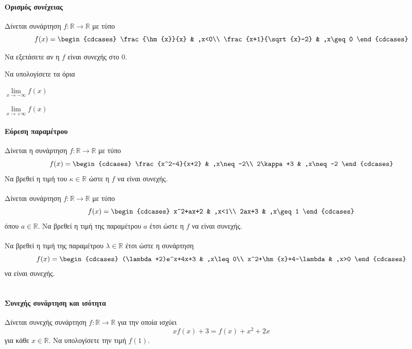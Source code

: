 \documentclass[11pt,a4paper,modern]{FFExercises}
\begin{document}
\paragraph{Ορισμός συνέχειας}
\askhsh Δίνεται συνάρτηση $f:\mathbb{R}\to\mathbb{R}$ με τύπο
\[ f(x)=\begin{cdcases}
\frac{\hm{x}}{x} & ,x<0\\ \frac{x+1}{\sqrt{x}-2} & ,x\geq 0
\end{cdcases} \]
\begin{alist}
\item Να εξετάσετε αν η $f$ είναι συνεχής στο $0$.
\item Να υπολογίσετε τα όρια
\begin{multicols}{2}
\begin{rlist}
\item $\lim\limits_{x\to-\infty}{f(x)}$
\item $\lim\limits_{x\to+\infty}{f(x)}$
\end{rlist}
\end{multicols}
\end{alist}
\paragraph{Εύρεση παραμέτρου}
\askhsh Δίνεται η συνάρτηση $f:\mathbb{R}\to\mathbb{R}$ με τύπο
\[ f(x)=\begin{cdcases}
\frac{x^2-4}{x+2} & ,x\neq -2\\ 2\kappa+3 & ,x\neq -2
\end{cdcases} \]
Να βρεθεί η τιμή του $\kappa\in\mathbb{R}$ ώστε η $f$ να είναι συνεχής.\\\\
\askhsh
Δίνεται συνάρτηση $f:\mathbb{R}\to\mathbb{R}$ με τύπο
\[ f(x)=\begin{cdcases}
x^2+ax+2 & ,x<1\\ 2ax+3 & ,x\geq 1
\end{cdcases} \]
όπου $a\in\mathbb{R}$. Να βρεθεί η τιμή της παραμέτρου $a$ έτσι ώστε η $f$ να είναι συνεχής.\\\\
\askhsh Να βρεθεί η τιμή της παραμέτρου $\lambda\in\mathbb{R}$ έτσι ώστε η συνάρτηση
\[ f(x)=\begin{cdcases}
(\lambda+2)e^x+4x+3 & ,x\leq 0\\ x^2+\hm{x}+4-\lambda & ,x>0
\end{cdcases} \]
να είναι συνεχής.\\\\
\paragraph{Συνεχής συνάρτηση και ισότητα}
\askhsh Δίνεται συνεχής συνάρτηση $f:\mathbb{R}\to\mathbb{R}$ για την οποία ισχύει
\[ xf(x)+3=f(x)+x^2+2x \]
για κάθε $x\in\mathbb{R}$. Να υπολογίσετε την τιμή $f(1)$.
\end{document}
